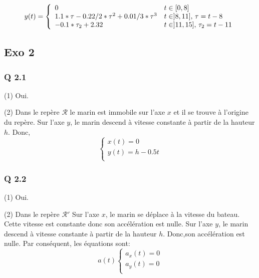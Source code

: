 \documentclass[]{book}
\theoremstyle{definition}
\begin{document}
$$ y(t) =
\left\{ 
\begin{array}{l l}
0 &  t \in [0,8] \\
1.1*\tau - 0.22/2*\tau^2 + 0.01/3*\tau^3 &  t \in ]8,11],\, \tau = t-8 \\
-0.1*\tau_2+2.32 &  t \in ]11,15],\, \tau_2 = t-11 \\
\end{array}
\right. 
$$



\subsection*{Exo 2}
\subsubsection*{Q 2.1}
(1) Oui.


(2) Dans le rep\`ere $\mathcal{R}$ le marin est immobile sur l'axe $x$ et il se trouve \`a l'origine du rep\`ere.
Sur l'axe $y$, le marin descend \`a vitesse constante \`a partir de la hauteur $h$. Donc, 
$$ 
\left\{ 
\begin{array}{l}
x(t) = 0 \\
y(t) = h -0.5t \\
\end{array}
\right. 
$$

\subsubsection*{Q 2.2}
(1) Oui.

(2) Dans le rep\`ere $\mathcal{R'}$ Sur l'axe $x$, le marin se d\'eplace \`a la vitesse du bateau. Cette vitesse est 
constante donc son acc\'el\'eration est nulle.
Sur l'axe $y$, le marin descend \`a vitesse constante \`a partir de la hauteur $h$. Donc,son acc\'el\'eration est nulle.  
Par cons\'equent, les \'equations sont:
$$ a(t)
\left\{ 
\begin{array}{l}
a_x(t) = 0 \\
a_y(t) = 0 \\
\end{array}
\right. 
$$
\end{document}
